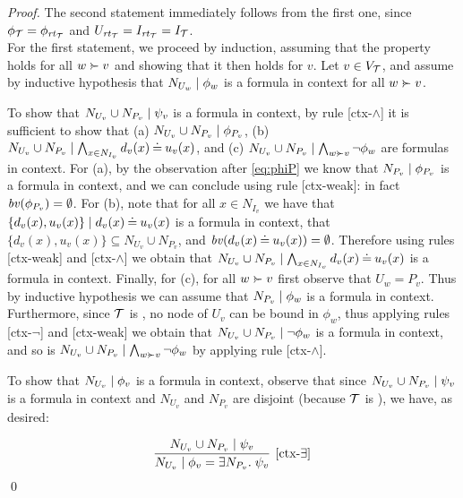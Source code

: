 \begin{proof}
	The second statement immediately follows from the first one, since  $\phi_{\mathcal{T}} = \phi_{\mathit{rt}_{{\mathcal{T}}}}$ and $U_{\mathit{rt}_{{\mathcal{T}}}} = I_{\mathit{rt}_{{\mathcal{T}}}} = I_{\mathcal{T}}$.\\
%
For the first statement, we proceed by induction, assuming that the property holds for all $w\childof v$ and showing that it then holds for $v$.
	Let $v\in V_{\mathcal{T}}$, and assume by inductive hypothesis that ${N_{U_w}} \mid {\phi_w}$ is a formula in context for all $w\childof v$. 
	
	To show that ${N_{U_v} \cup N_{P_v}} \mid {\psi_v}$ is a formula in context, by rule [ctx-$\wedge$] it is sufficient to show that 
	(a) ${N_{U_v} \cup N_{P_v}} \mid {\phi_{P_v}}$, (b) ${N_{U_v} \cup N_{P_v}} \mid {\bigwedge_{x\in N_{I_v}} d_v(x)\mathbin{\doteq}u_v(x)}$, and (c) $\ctx{N_{U_v} \cup N_{P_v}}{\bigwedge_{w\childof v} \neg\phi_w}$ are formulas in context. For (a), by the observation after \eqref{eq:phiP} we know that ${N_{P_v}} \mid {\phi_{P_v}}$ is a formula in context, and we can conclude using rule [ctx-weak]: in fact $\mathit{bv}(\phi_{P_v}) = \emptyset$.
	For (b), note that for all $x \in N_{I_v}$ we have that ${\{d_v(x),u_v(x)\}} \mid {d_v(x)\mathbin{\doteq}u_v(x)}$ is a formula in context, that $\{d_v(x),u_v(x)\} \subseteq N_{U_v} \cup N_{P_v}$, and $\mathit{bv}(d_v(x)\mathbin{\doteq} u_v(x))= \emptyset$. Therefore using rules [ctx-weak] and [ctx-$\wedge$] we obtain that ${N_{U_v} \cup N_{P_v}} \mid {\bigwedge_{x\in N_{I_v}} d_v(x)\mathbin{\doteq}u_v(x)}$ is a formula in context. Finally, for (c), for all $w\childof v$ first observe that $U_w = P_v$. Thus by inductive hypothesis we can assume that ${N_{P_v}} \mid {\phi_w}$ is a formula in context. Furthermore,  since ${\mathcal{T}}$ is {\proper}, no node of $U_v$ can be bound in $\phi_w$, thus applying rules [ctx-$\neg$] and [ctx-weak] we obtain that ${N_{U_v} \cup N_{P_v}} \mid {\neg\phi_w}$ is a formula in context, and so is 
	$\ctx{N_{U_v} \cup N_{P_v}}{\bigwedge_{w\childof v} \neg\phi_w}$ by applying rule [ctx-$\wedge$].

	To show that ${N_{U_v}} \mid {\phi_v}$ is a formula in context, observe that since ${N_{U_v} \cup N_{P_v}} \mid {\psi_v}$ is a formula in context and $N_{U_v}$ and $N_{P_v}$ are disjoint (because ${\mathcal{T}}$ is {\proper}), we have, as desired:

	$$\infer[{[\mbox{ctx-}\exists]}]
	{\ctx{N_{U_v}}{\phi_v = \exists N_{P_v}\st \psi_v}}
	{\ctx{N_{U_v} \cup N_{P_v}}{\psi_v}}$$
	\qed	
\end{proof}

